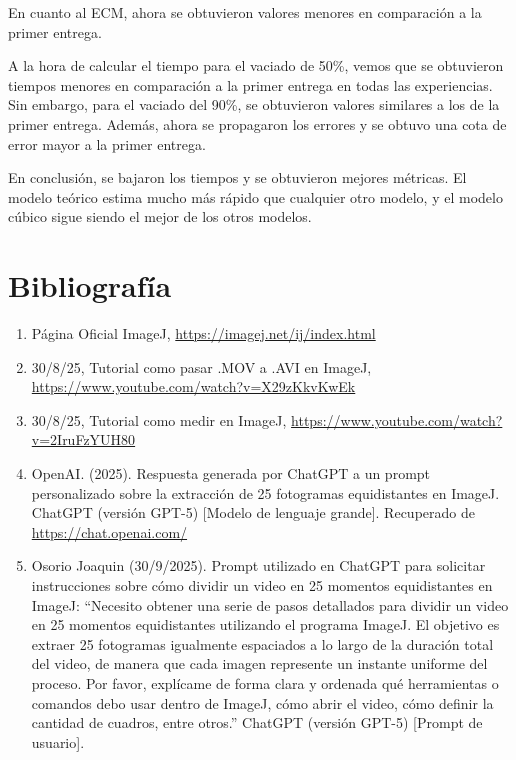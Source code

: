\documentclass{article}
\begin{document}
En cuanto al ECM, ahora se obtuvieron valores menores en comparación a la primer entrega.

A la hora de calcular el tiempo para el vaciado de 50\%, vemos que se obtuvieron tiempos menores en comparación a la primer entrega en todas las experiencias. Sin embargo, para el vaciado del 90\%, se obtuvieron valores similares a los de la primer entrega. Además, ahora se propagaron los errores y se obtuvo una cota de error mayor a la primer entrega. 

En conclusión, se bajaron los tiempos y se obtuvieron mejores métricas. El modelo teórico estima mucho más rápido que cualquier otro modelo, y el modelo cúbico sigue siendo el mejor de los otros modelos. 

\newpage
\section{Bibliografía}

\begin{enumerate}
    \item Página Oficial ImageJ, \url{https://imagej.net/ij/index.html}
    \item 30/8/25, Tutorial como pasar .MOV a .AVI en ImageJ, \url{https://www.youtube.com/watch?v=X29zKkvKwEk}
    \item 30/8/25, Tutorial como medir en ImageJ, \url{https://www.youtube.com/watch?v=2IruFzYUH80}
    \item OpenAI. (2025). Respuesta generada por ChatGPT a un prompt personalizado sobre la extracción de 25 fotogramas equidistantes en ImageJ. ChatGPT (versión GPT-5) [Modelo de lenguaje grande]. Recuperado de \url{https://chat.openai.com/}
    \item Osorio Joaquin (30/9/2025). Prompt utilizado en ChatGPT para solicitar instrucciones sobre cómo dividir un video en 25 momentos equidistantes en ImageJ: “Necesito obtener una serie de pasos detallados para dividir un video en 25 momentos equidistantes utilizando el programa ImageJ. El objetivo es extraer 25 fotogramas igualmente espaciados a lo largo de la duración total del video, de manera que cada imagen represente un instante uniforme del proceso. Por favor, explícame de forma clara y ordenada qué herramientas o comandos debo usar dentro de ImageJ, cómo abrir el video, cómo definir la cantidad de cuadros, entre otros.” ChatGPT (versión GPT-5) [Prompt de usuario].
\end{enumerate}
\end{document}

